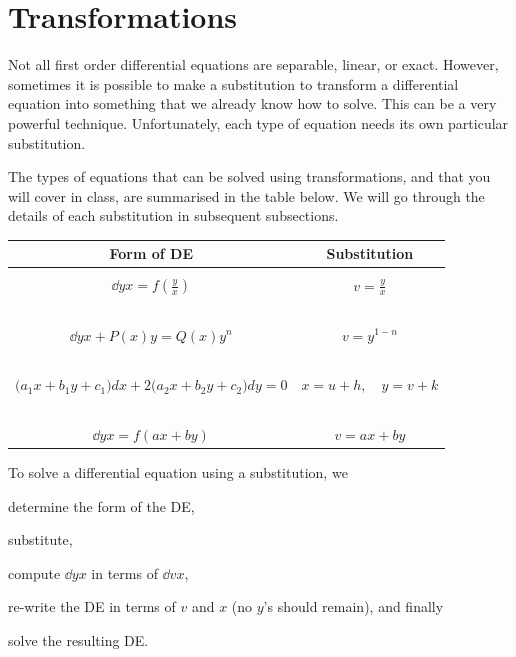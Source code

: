 \documentclass{book}
\begin{document}


\newpage
\section{Transformations}

Not all first order differential equations are separable, linear, or
exact.  However, sometimes it is possible to make a substitution to
transform a differential equation into something that we already know
how to solve.  This can be a very powerful technique.  Unfortunately,
each type of equation needs its own particular substitution.

The types of equations that can be solved using transformations, and
that you will cover in class, are summarised in the table below.  We
will go through the details of each substitution in subsequent
subsections.

\begin{center}
  \begin{tabular}{cc}
    Form of DE & Substitution \\ \midrule \hspace{2in} & \hspace{2in} \\
    $\dd{y}{x} = f\left( \frac{y}{x} \right)$
      & $v = \frac{y}{x}$ \\ \ \\
    $\dd{y}{x} + P(x) y = Q(x)y^n$
      & $v = y^{1-n}$ \\ \ \\
    $\bigl(a_1 x + b_1 y + c_1\bigr)dx +2 \bigl(a_2 x + b_2 y + c_2\bigr)dy = 0$
      & $x = u+h, \quad y = v+k$ \\ \ \\
    $\dd{y}{x} = f(ax+by)$
      & $v = ax + by$
  \end{tabular}
\end{center}

To solve a differential equation using a substitution, we
\begin{enumerate*}
\item determine the form of the DE,
\item substitute,
\item compute $\dd{y}{x}$ in terms of $\dd{v}{x}$,
\item re-write the DE in terms of $v$ and $x$ (no $y$'s should remain), and finally
\item solve the resulting DE.
\end{enumerate*}
\end{document}

